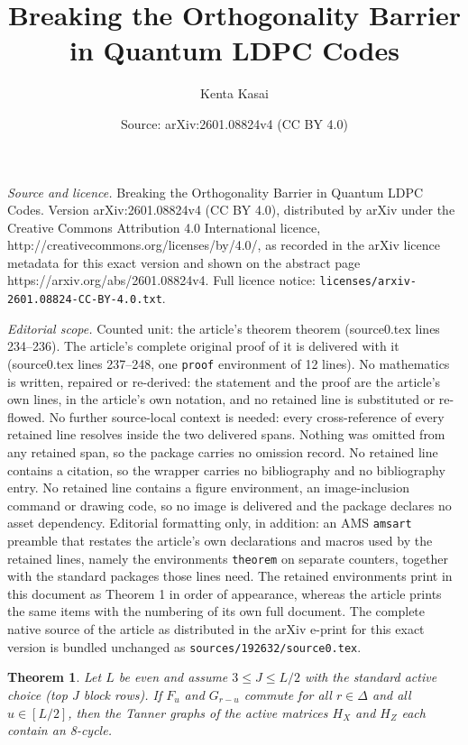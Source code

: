 \documentclass[10pt,a4paper]{amsart}
\title{Breaking the Orthogonality Barrier in Quantum LDPC Codes}
\author{Kenta Kasai}
\date{Source: arXiv:2601.08824v4 (CC BY 4.0)}
\newtheorem{theorem}{Theorem}
\begin{document}
\maketitle

\noindent\emph{Source and licence.} Breaking the Orthogonality Barrier in Quantum LDPC Codes. Version arXiv:2601.08824v4 (CC BY 4.0), distributed by arXiv under the Creative Commons Attribution 4.0 International licence, http://creativecommons.org/licenses/by/4.0/, as recorded in the arXiv licence metadata for this exact version and shown on the abstract page https://arxiv.org/abs/2601.08824v4. Full licence notice: \texttt{licenses/arxiv-2601.08824-CC-BY-4.0.txt}.\par\smallskip

\noindent\textit{Editorial scope.} Counted unit: the article's theorem theorem (source0.tex lines 234--236). The article's complete original proof of it is delivered with it (source0.tex lines 237--248, one \texttt{proof} environment of 12 lines). No mathematics is written, repaired or re-derived: the statement and the proof are the article's own lines, in the article's own notation, and no retained line is substituted or re-flowed.  No further source-local context is needed: every cross-reference of every retained line resolves inside the two delivered spans.  Nothing was omitted from any retained span, so the package carries no omission record.  No retained line contains a citation, so the wrapper carries no bibliography and no bibliography entry.  No retained line contains a figure environment, an image-inclusion command or drawing code, so no image is delivered and the package declares no asset dependency.  Editorial formatting only, in addition: an AMS \texttt{amsart} preamble that restates the article's own declarations and macros used by the retained lines, namely the environments \texttt{theorem} on separate counters, together with the standard packages those lines need.  The retained environments print in this document as Theorem 1 in order of appearance, whereas the article prints the same items with the numbering of its own full document.  The complete native source of the article as distributed in the arXiv e-print for this exact version is bundled unchanged as \texttt{sources/192632/source0.tex}.
\begin{theorem}
Let $L$ be even and assume $3\le J\le L/2$ with the standard active choice (top $J$ block rows). If $F_u$ and $G_{r-u}$ commute for all $r\in\Delta$ and all $u\in[L/2]$, then the Tanner graphs of the active matrices $H_X$ and $H_Z$ each contain an 8-cycle.
\end{theorem}
\end{document}
